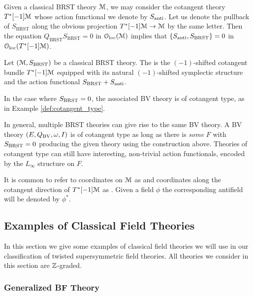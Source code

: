 \documentclass[10pt, oneside]{article}
\begin{document}
Given a classical BRST theory $\mathcal M$, we may consider the cotangent theory $T^*[-1]\mathcal M$ whose action functional we denote by $S_{\rm anti}$.
Let us denote the pullback of $S_{\mathrm{BRST}}$ along the obvious projection $T^*[-1]\mathcal M\rightarrow \mathcal M$ by the same letter. Then the equation $Q_{\mathrm{BRST}} S_{\mathrm{BRST}} = 0$ in $\mathcal{O}_{\rm loc}(\mathcal M)$ implies that $\{S_{\rm anti}, S_{\mathrm{BRST}}\} = 0$ in $\mathcal{O}_{\rm loc}(T^*[-1]\mathcal M)$.

\begin{definition}
Let $(\mathcal M, S_{\mathrm{BRST}})$ be a classical BRST theory. The  is the $(-1)$-shifted cotangent bundle $T^*[-1]\mathcal M$ equipped with its natural $(-1)$-shifted symplectic structure and the action functional $S_{\mathrm{BRST}} + S_{\rm anti}$.
\end{definition}

In the case where $S_{\mathrm{BRST}} = 0$, the associated BV theory is of cotangent type, as in Example \ref{def:cotangent_type}.

\begin{remark}
In general, multiple BRST theories can give rise to the same BV theory.  A BV theory $(E, Q_{\mathrm{BV}}, \omega, I)$ is of cotangent type as long as there is \emph{some} $F$ with $S_{\mathrm{BRST}} = 0$ producing the given theory using the construction above.  Theories of cotangent type can still have interesting, non-trivial action functionals, encoded by the $L_\infty$ structure on $F$.
\end{remark}

\begin{remark}
It is common to refer to coordinates on $\mathcal M$ as  and coordinates along the cotangent direction of $T^*[-1]\mathcal M$ as . Given a field $\phi$ the corresponding antifield will be denoted by $\phi^*$.
\end{remark}

\subsection{Examples of Classical Field Theories}

In this section we give some examples of classical field theories we will use in our classification of twisted supersymmetric field theories. All theories we consider in this section are $\mathbb Z$-graded.

\subsubsection{Generalized BF Theory} \label{gen_BF_section}
\end{document}
